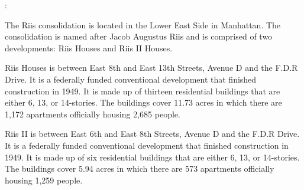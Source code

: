 :

The Riis consolidation is located in the Lower East Side in Manhattan. The consolidation is named after Jacob Augustus Riis and is comprised of two developments: Riis Houses and Riis II Houses.

Riis Houses is between East 8th and East 13th Streets, Avenue D and the F.D.R Drive. It is a federally funded conventional development that finished construction in 1949. It is made up of thirteen residential buildings that are either 6, 13, or 14-stories. The buildings cover 11.73 acres in which there are 1,172 apartments officially housing 2,685 people. 

Riis II is between East 6th and East 8th Streets, Avenue D and the F.D.R Drive. It is a federally funded conventional development that finished construction in 1949. It is made up of six residential buildings that are either 6, 13, or 14-stories. The buildings cover 5.94 acres in which there are 573 apartments officially housing 1,259 people. 